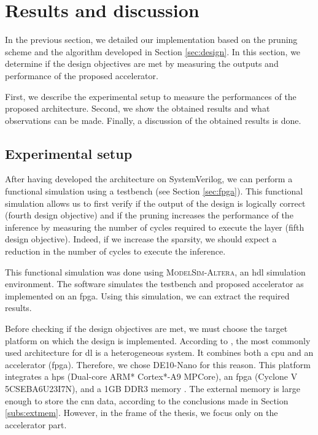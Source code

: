 \section{Results and discussion} \label{sec:measure}
In the previous section, we detailed our implementation based on the pruning scheme and the algorithm developed in Section \ref{sec:design}. In this section, we determine if the design objectives are met by measuring the outputs and performance of the proposed accelerator.

First, we describe the experimental setup to measure the performances of the proposed architecture. Second, we show the obtained results and what observations can be made. Finally, a discussion of the obtained results is done.
%
\subsection{Experimental setup} \label{subs:exp_set}
%
After having developed the architecture on SystemVerilog, we can perform a functional simulation using a testbench (see Section \ref{sec:fpga}). This functional simulation allows us to first verify if the output of the design is logically correct (fourth design objective) and if the pruning increases the performance of the inference by measuring the number of cycles required to execute the layer (fifth design objective). Indeed, if we increase the sparsity, we should expect a reduction in the number of cycles to execute the inference.

This functional simulation was done using \textsc{ModelSim-Altera}, an \acrshort{hdl} simulation environment. The software simulates the testbench and proposed accelerator as implemented on an \acrshort{fpga}. Using this simulation, we can extract the required results.

Before checking if the design objectives are met, we must choose the target platform on which the design is implemented. According to \textcite{liu_fpga-based_2019}, the most commonly used architecture for \acrshort{dl} is a heterogeneous system. It combines both a \acrshort{cpu} and an accelerator (\acrshort{fpga}). Therefore, we chose DE10-Nano for this reason. This platform integrates a \acrfull{hps} (Dual-core ARM* Cortex*-A9 MPCore), an \acrshort{fpga} (Cyclone V 5CSEBA6U23I7N), and a 1GB DDR3 memory \cite{technologies_terasic_nodate}. The external memory is large enough to store the \acrshort{cnn} data, according to the conclusions made in Section \ref{subs:extmem}. However, in the frame of the thesis, we focus only on the accelerator part.

